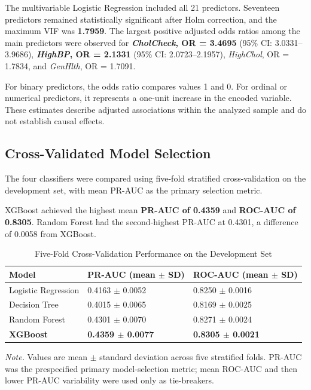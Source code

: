 \documentclass[pdflatex,sn-basic,Numbered]{sn-jnl}
\begin{document}
The multivariable Logistic Regression included all 21 predictors.
Seventeen predictors remained statistically significant after Holm
correction, and the maximum VIF was \textbf{1.7959}.
The largest positive adjusted odds ratios among the main predictors were
observed for
\textbf{\textit{CholCheck}, OR = 3.4695}
(95\% CI: 3.0331--3.9686),
\textbf{\textit{HighBP}, OR = 2.1331}
(95\% CI: 2.0723--2.1957),
\textit{HighChol}, OR = 1.7834, and
\textit{GenHlth}, OR = 1.7091.

For binary predictors, the odds ratio compares values 1 and 0.
For ordinal or numerical predictors, it represents a one-unit increase in
the encoded variable.
These estimates describe adjusted associations within the analyzed sample
and do not establish causal effects.


\subsection{Cross-Validated Model Selection}
\label{subsec:ml_results}

The four classifiers were compared using five-fold stratified
cross-validation on the development set, with mean PR-AUC as the primary
selection metric.

XGBoost achieved the highest mean
\textbf{PR-AUC of 0.4359} and
\textbf{ROC-AUC of 0.8305}.
Random Forest had the second-highest PR-AUC at 0.4301, a difference of
0.0058 from XGBoost.

\begin{table}[htbp]
\centering
\caption{Five-Fold Cross-Validation Performance on the Development Set}
\label{tab:model_comparison}
\footnotesize
\renewcommand{\arraystretch}{1.4}
\setlength{\tabcolsep}{7pt}

\begin{tabularx}{\linewidth}{lYY}
\toprule
Model & PR-AUC (mean $\pm$ SD) & ROC-AUC (mean $\pm$ SD) \\
\midrule

Logistic Regression & 0.4163 $\pm$ 0.0052 & 0.8250 $\pm$ 0.0016 \\
Decision Tree       & 0.4015 $\pm$ 0.0065 & 0.8169 $\pm$ 0.0025 \\
Random Forest       & 0.4301 $\pm$ 0.0070 & 0.8271 $\pm$ 0.0024 \\
\textbf{XGBoost}    & \textbf{0.4359 $\pm$ 0.0077} & \textbf{0.8305 $\pm$ 0.0021} \\

\bottomrule
\end{tabularx}

\vspace{1mm}

\begin{minipage}{\linewidth}
\scriptsize
\textit{Note.}
Values are mean $\pm$ standard deviation across five stratified folds.
PR-AUC was the prespecified primary model-selection metric; mean ROC-AUC and then lower PR-AUC variability were used only as tie-breakers.
\end{minipage}
\end{table}
\end{document}
